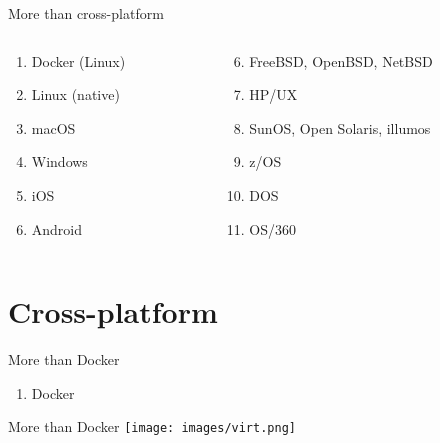 \documentclass[aspectratio=169]{beamer}
\begin{document}
\begin{frame}{More than cross-platform}
    \begin{columns}
        \begin{column}{0.5\textwidth}
           \begin{enumerate}[<+->]
                \item[0.] Docker (Linux)
                \item Linux (native)
                \item macOS
                \item Windows
                \item iOS
                \item Android
           \end{enumerate}
        \end{column}
        \begin{column}{0.5\textwidth}  %
            \begin{enumerate}[<+->]
                \setcounter{enumi}{5}
                \item FreeBSD, OpenBSD, NetBSD
                \item HP/UX
                \item SunOS, Open Solaris, illumos
                \item z/OS
                \item DOS
                \item OS/360
            \end{enumerate}
        \end{column}
    \end{columns}
\end{frame}

\section{Cross-platform}

\begin{frame}{More than Docker}
    \begin{enumerate}
        \item[0.] Docker
    \end{enumerate}
\end{frame}

\begin{frame}{More than Docker}
    \centering
    \texttt{[image: images/virt.png]}
\end{frame}
\end{document}
